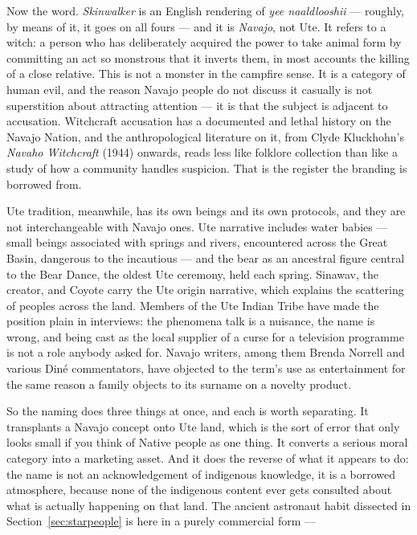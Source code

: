 Now the word. \emph{Skinwalker} is an English rendering of \emph{yee naaldlooshii} --- roughly,
by means of it, it goes on all fours --- and it is \emph{Navajo}, not Ute. It refers to a witch:
a person who has deliberately acquired the power to take animal form by committing an act so
monstrous that it inverts them, in most accounts the killing of a close relative. This is not a
monster in the campfire sense. It is a category of human evil, and the reason Navajo people do not
discuss it casually is not superstition about attracting attention --- it is that the subject is
adjacent to accusation. Witchcraft accusation has a documented and lethal history on the Navajo
Nation, and the anthropological literature on it, from Clyde Kluckhohn's \emph{Navaho Witchcraft}
(1944) onwards, reads less like folklore collection than like a study of how a community handles
suspicion.  That is the register the branding is borrowed from.

Ute tradition, meanwhile, has its own beings and its own protocols, and they are not
interchangeable with Navajo ones. Ute narrative includes water babies --- small beings associated
with springs and rivers, encountered across the Great Basin, dangerous to the incautious --- and
the bear as an ancestral figure central to the Bear Dance, the oldest Ute ceremony, held each
spring. Sinawav, the creator, and Coyote carry the Ute origin narrative, which explains the
scattering of peoples across the land. Members of the Ute Indian Tribe have made the position
plain in interviews: the phenomena talk is a nuisance, the name is wrong, and being cast as the
local supplier of a curse for a television programme is not a role anybody asked for. Navajo
writers, among them Brenda Norrell and various Din\'e commentators, have objected to the term's use
as entertainment for the same reason a family objects to its surname on a novelty product.

So the naming does three things at once, and each is worth separating. It transplants a Navajo
concept onto Ute land, which is the sort of error that only looks small if you think of Native
people as one thing. It converts a serious moral category into a marketing asset. And it does the
reverse of what it appears to do: the name is not an acknowledgement of indigenous knowledge, it is
a borrowed atmosphere, because none of the indigenous content ever gets consulted about what is
actually happening on that land. The ancient astronaut habit dissected in
Section~\ref{sec:starpeople} is here in a purely commercial form --- 


